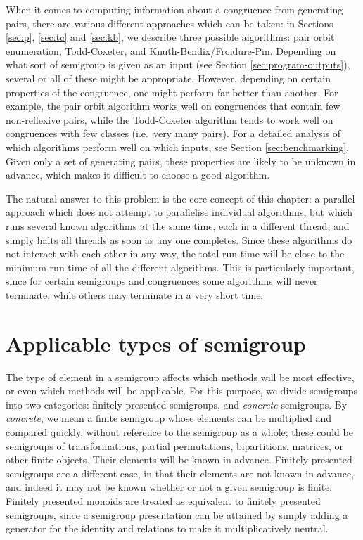 When it comes to computing information about a congruence from generating pairs,
there are various different approaches which can be taken: in Sections
\ref{sec:p}, \ref{sec:tc} and \ref{sec:kb}, we describe three possible
algorithms: pair orbit enumeration, Todd-Coxeter, and Knuth-Bendix/Froidure-Pin.
Depending on what sort of semigroup is given as an input (see Section
\ref{sec:program-outputs}), several
or all of these might be appropriate.  However, depending on certain properties
of the congruence, one might perform far better than another.  For example, the
pair orbit algorithm works well on congruences that contain few non-reflexive
pairs, while the Todd-Coxeter algorithm tends to work well on congruences with
few classes (i.e.~very many pairs).  For a detailed analysis of which algorithms
perform well on which inputs, see Section \ref{sec:benchmarking}.  Given
only a set of generating pairs, these properties are likely to be unknown in
advance, which makes it difficult to choose a good algorithm.

The natural answer to this problem is the core concept of this chapter: a
parallel approach which does not attempt to parallelise individual algorithms,
but which runs several known algorithms at the same time, each in a different
thread, and simply halts all threads as soon as any one completes.  Since these
algorithms do not interact with each other in any way, the total run-time will
be close to the minimum run-time of all the different algorithms.  This is
particularly important, since for certain semigroups and congruences some
algorithms will never terminate, while others may terminate in a very short
time.

\section{Applicable types of semigroup}
\label{sec:applicable-types-of-semigroup}

The type of element in a semigroup affects which methods will be most effective,
or even which methods will be applicable.  For this purpose, we divide
semigroups into two categories: finitely presented semigroups, and
\textit{concrete} semigroups.  By \textit{concrete}, we mean a finite semigroup
whose elements can be multiplied and compared quickly, without reference to the
semigroup as a whole; these could be semigroups of transformations, partial
permutations, bipartitions, matrices, or other finite objects.  Their elements
will be known in advance.  Finitely presented semigroups are a different case,
in that their elements are not known in advance, and indeed it may not be known
whether or not a given semigroup is finite.  Finitely presented monoids are treated as
equivalent to finitely presented semigroups, since a semigroup presentation can
be attained by simply adding a generator for the identity and relations to make
it multiplicatively neutral.


